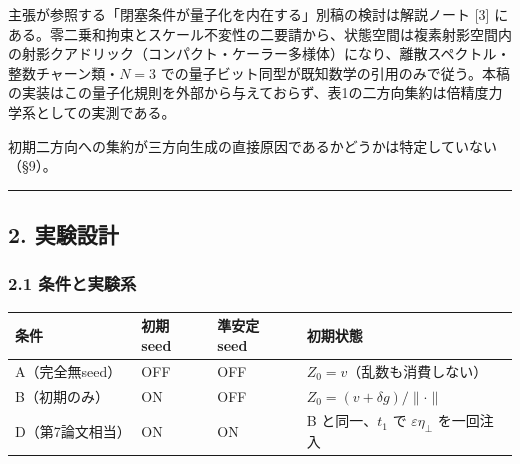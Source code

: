 \documentclass[
  a4paper,
]{ltjsarticle}
\newcounter{none} %
\begin{document}
主張が参照する「閉塞条件が量子化を内在する」別稿の検討は解説ノート
{[}3{]}
にある。零二乗和拘束とスケール不変性の二要請から、状態空間は複素射影空間内の射影クアドリック（コンパクト・ケーラー多様体）になり、離散スペクトル・整数チャーン類・\(N=3\)
での量子ビット同型が既知数学の引用のみで従う。本稿の実装はこの量子化規則を外部から与えておらず、表1の二方向集約は倍精度力学系としての実測である。

初期二方向への集約が三方向生成の直接原因であるかどうかは特定していない（§9）。

\begin{center}\rule{0.5\linewidth}{0.5pt}\end{center}

\subsection{2. 実験設計}\label{ux5b9fux9a13ux8a2dux8a08}

\subsubsection{2.1
条件と実験系}\label{ux6761ux4ef6ux3068ux5b9fux9a13ux7cfb}

{\def\LTcaptype{none} %
\begin{longtable}[]{@{}
  >{\raggedright\arraybackslash}p{}
  >{\centering\arraybackslash}p{}
  >{\centering\arraybackslash}p{}
  >{\raggedright\arraybackslash}p{}@{}}
\toprule\noalign{}
\begin{minipage}[b]{\linewidth}\raggedright
条件
\end{minipage} & \begin{minipage}[b]{\linewidth}\centering
初期 seed
\end{minipage} & \begin{minipage}[b]{\linewidth}\centering
準安定 seed
\end{minipage} & \begin{minipage}[b]{\linewidth}\raggedright
初期状態
\end{minipage} \\
\midrule\noalign{}
\endhead
\bottomrule\noalign{}
\endlastfoot
A（完全無seed） & OFF & OFF & \(Z_0=v\)（乱数も消費しない） \\
B（初期のみ） & ON & OFF & \(Z_0=(v+\delta g)/\lVert\cdot\rVert\) \\
D（第7論文相当） & ON & ON & B と同一、\(t_1\) で
\(\varepsilon\eta_\perp\) を一回注入 \\
\end{longtable}
}
\end{document}
